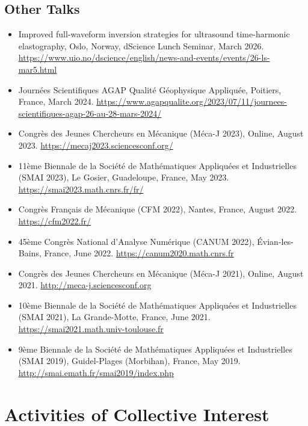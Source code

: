 \documentclass[10pt]{article}
\begin{document}
\subsection{Other Talks}
\begin{itemize}
\item Improved full-waveform inversion strategies for ultrasound time-harmonic elastography, Oslo, Norway, dScience Lunch Seminar, March 2026. \url{https://www.uio.no/dscience/english/news-and-events/events/26-ls-mar5.html}
\item Journées Scientifiques AGAP Qualité Géophysique Appliquée, Poitiers, France, March 2024. \url{https://www.agapqualite.org/2023/07/11/journees-scientifiques-agap-26-au-28-mars-2024/}
\item Congrès des Jeunes Chercheurs en Mécanique (Méca-J 2023), Online, August 2023. \url{https://mecaj2023.sciencesconf.org/}
\item 11ème Biennale de la Société de Mathématiques Appliquées et Industrielles (SMAI 2023), Le Gosier, Guadeloupe, France, May 2023. \url{https://smai2023.math.cnrs.fr/fr/}
\item Congrès Français de Mécanique (CFM 2022), Nantes, France, August 2022. \url{https://cfm2022.fr/}
\item 45ème Congrès National d'Analyse Numérique (CANUM 2022), Évian-les-Bains, France, June 2022. \url{https://canum2020.math.cnrs.fr}
\item Congrès des Jeunes Chercheurs en Mécanique (Méca-J 2021), Online, August 2021. \url{http://meca-j.sciencesconf.org}
\item 10ème Biennale de la Société de Mathématiques Appliquées et Industrielles (SMAI 2021), La Grande-Motte, France, June 2021. \url{https://smai2021.math.univ-toulouse.fr}
\item 9ème Biennale de la Société de Mathématiques Appliquées et Industrielles (SMAI 2019), Guidel-Plages (Morbihan), France, May 2019. \url{http://smai.emath.fr/smai2019/index.php}
\end{itemize}


\section{Activities of Collective Interest}
\end{document}
